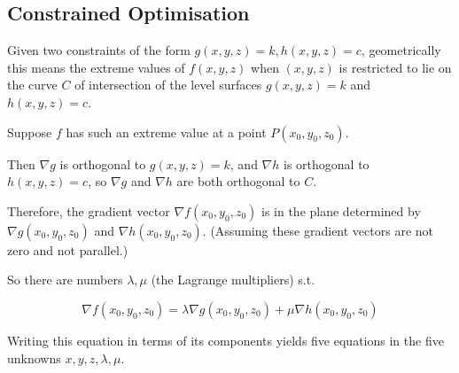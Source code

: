 \subsection{Constrained Optimisation}

\begin{paracol}{2}


\switchcolumn

Given two constraints of the form $g(x, y, z) = k, h(x, y, z) =c$, geometrically this means the extreme values of $f(x, y, z)$ when $(x, y, z)$ is restricted to lie on the curve $C$ of intersection of the level surfaces $g(x, y, z) = k$ and $h(x, y, z) = c$.

Suppose $f$ has such an extreme value at a point $P(x_0, y_0, z_0)$.

Then $\nabla g$ is orthogonal to $g(x, y, z) = k$, and $\nabla h$ is orthogonal to $h(x, y, z) = c$, so $\nabla g$ and $\nabla h$ are both orthogonal to $C$.

Therefore, the gradient vector $\nabla f(x_0, y_0, z_0)$ is in the plane determined by $\nabla g(x_0, y_0, z_0)$ and $\nabla h(x_0, y_0, z_0)$. (Assuming these gradient vectors are not zero and not parallel.)

So there are numbers $\lambda, \mu$ (the Lagrange multipliers) s.t.

\vspace{-10pt}

$$\nabla f(x_0, y_0, z_0) = \lambda \nabla g(x_0, y_0, z_0) + \mu \nabla h(x_0, y_0, z_0)$$

Writing this equation in terms of its components yields five equations in the five unknowns $x, y, z, \lambda, \mu$.

\end{paracol}
